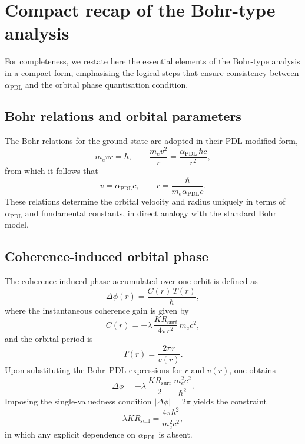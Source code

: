 \documentclass[11pt,a4paper]{article}
\begin{document}
\section{Compact recap of the Bohr-type analysis}
\label{sec:BohrVerification}

For completeness, we restate here the essential elements of the Bohr-type analysis in a compact form, emphasising the logical steps that ensure consistency between \(\alpha_{\mathrm{PDL}}\) and the orbital phase quantisation condition.

\subsection{Bohr relations and orbital parameters}

The Bohr relations for the ground state are adopted in their PDL-modified form,
\begin{equation}
m_e v r = \hbar, 
\qquad 
\frac{m_e v^{2}}{r} = \frac{\alpha_{\mathrm{PDL}} \,\hbar c}{r^{2}},
\end{equation}
from which it follows that
\begin{equation}
v = \alpha_{\mathrm{PDL}} c, 
\qquad 
r = \frac{\hbar}{m_e \alpha_{\mathrm{PDL}} c}.
\end{equation}
These relations determine the orbital velocity and radius uniquely in terms of \(\alpha_{\mathrm{PDL}}\) and fundamental constants, in direct analogy with the standard Bohr model.

\subsection{Coherence-induced orbital phase}

The coherence-induced phase accumulated over one orbit is defined as
\begin{equation}
\Delta \phi(r) = \frac{C(r)\,T(r)}{\hbar},
\end{equation}
where the instantaneous coherence gain is given by
\begin{equation}
C(r) = -\lambda \,\frac{K R_{\mathrm{surf}}}{4\pi r^{2}} \,m_e c^{2},
\end{equation}
and the orbital period is
\begin{equation}
T(r) = \frac{2\pi r}{v(r)}.
\end{equation}
Upon substituting the Bohr–PDL expressions for \(r\) and \(v(r)\), one obtains
\begin{equation}
\Delta \phi = -\lambda \,\frac{K R_{\mathrm{surf}}}{2}\,\frac{m_e^{2} c^{2}}{\hbar^{2}}.
\end{equation}
Imposing the single-valuedness condition \(|\Delta \phi| = 2\pi\) yields the constraint
\begin{equation}
\lambda K R_{\mathrm{surf}} = \frac{4\pi \hbar^{2}}{m_e^{2} c^{2}},
\end{equation}
in which any explicit dependence on \(\alpha_{\mathrm{PDL}}\) is absent.
\end{document}
